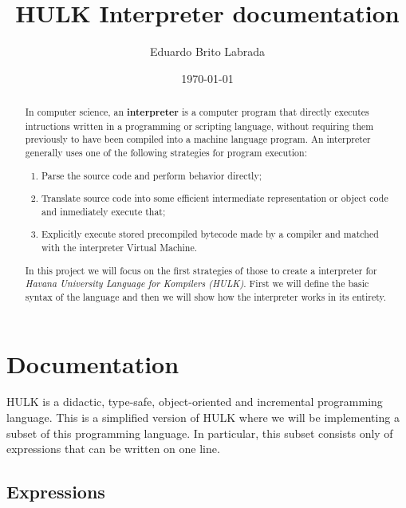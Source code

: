\documentclass[a4paper, 12pt]{report}
\begin{document}
\title{\bf HULK Interpreter documentation}
\author{Eduardo Brito Labrada}
\date{\today}
\maketitle

\begin{abstract}
  In computer science, an {\bf interpreter} is a computer program that directly executes
  intructions written in a programming or scripting language, without requiring them previously
  to have been compiled into a machine language program. An interpreter generally uses one of the
  following strategies for program execution:

  \begin{enumerate}
    \item Parse the source code and perform behavior directly;
    \item Translate source code into some efficient intermediate representation or object code
          and inmediately execute that;
    \item Explicitly execute stored precompiled bytecode made by a compiler and matched with the
          interpreter Virtual Machine.
  \end{enumerate}

  In this project we will focus on the first strategies of those to create a interpreter for
    {\em Havana University Language for Kompilers (HULK)}. First we will define the basic syntax of the
  language and then we will show how the interpreter works in its entirety.
\end{abstract}

\tableofcontents

\newpage

\section*{Documentation}

HULK is a didactic, type-safe, object-oriented and incremental programming language. This is a simplified
version of HULK where we will be implementing a subset of this programming language. In particular, this
subset consists only of expressions that can be written on one line.

\subsection*{Expressions}
\end{document}
